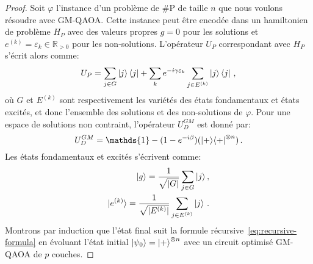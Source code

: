 \begin{proof}
    
Soit $\varphi$ l'instance d'un problème de \textsf{\#P} de taille $n$ que nous voulons résoudre avec GM-QAOA. Cette instance peut être encodée dans un hamiltonien de problème $H_{P}$ avec des valeurs propres $g = 0$ pour les solutions et $e^{(k)} = \varepsilon_{k} \in \mathbb{R}_{>0}$ pour les non-solutions. L'opérateur $U_{P}$ correspondant avec $H_{P}$ s'écrit alors comme:
\begin{equation}
    U_{P} = \sum_{j \in G} \ket{j}\bra{j} + \sum_{k} e^{-i \gamma \varepsilon_{k}} \sum_{j \in E^{(k)}} \ket{j}\bra{j} \,,
\end{equation} 
où $G$ et $E^{(k)}$ sont respectivement les variétés des états fondamentaux et états excités, et donc l'ensemble des solutions et des non-solutions de $\varphi$. Pour une espace de solutions non contraint, l'opérateur $U_{D}^{GM}$ est donné par:
\begin{equation}
    U_{D}^{GM} = \mathds{1} - (1 - e^{-i\beta}) (\ket{+}\!\bra{+}^{\otimes n}) \,.
\end{equation}
Les états fondamentaux et excités s'écrivent comme:
\begin{align}
    \ket{g} = \frac{1}{\sqrt{ \lvert G \rvert }} \sum_{j \in G} \ket{j}, \\
    \ket{e^{(k)}} = \frac{1}{\sqrt{ \lvert E^{(k)} \rvert }} \sum_{j \in E^{(k)}} \ket{j} \,.
\end{align}
Montrons par induction que l'état final suit la formule récursive~\ref{eq:recursive-formula} en évoluant l'état initial $\ket{\psi_{0}} = \ket{+}^{\otimes n}$ avec un circuit optimisé GM-QAOA de $p$ couches. 


\end{proof}
